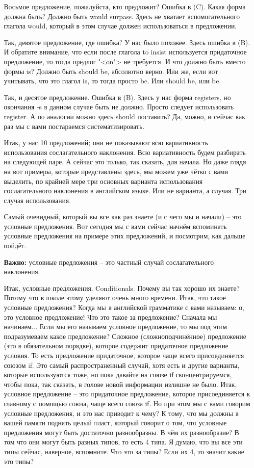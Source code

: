 \documentclass[main.tex]{subfiles}
\begin{document}
Восьмое предложение, пожалуйста, кто предложит?
Ошибка в (C).
Какая форма должна быть?
Должно быть would surpass.
Здесь не хватает вспомогательного глагола would, который в этом случае должен использоваться в предложении.

Так, девятое предложение, где ошибка?
У нас было похожее.
Здесь ошибка в (B).
И обратите внимание, что если после глагола to insist используется придаточное предложение, то тогда предлог "<on"> не требуется.
И что должно быть вместо формы is?
Должно быть should be, абсолютно верно.
Или же, если вот учитывать, что это глагол is, то тогда просто be.
Или should be, или be.

Так, и десятое предложение.
Ошибка в (B).
Здесь у нас форма registers, но окончания -s в данном случае быть не должно.
Просто следует использовать register.
А по аналогии можно здесь should поставить?
Да, можно, и сейчас как раз мы с вами постараемся систематизировать.

Итак, у нас 10 предложений; они не показывают всю вариативность использования сослагательного наклонения.
Всю вариативность будем разбирать на следующей паре.
А сейчас это только, так сказать, для начала.
Но даже глядя на вот примеры, которые представлены здесь, мы можем уже чётко с вами выделить, по крайней мере три основных варианта использования сослагательного наклонения в английском языке.
Или не варианта, а случая.
Три случая использования.

Самый очевидный, который вы все как раз знаете (и с чего мы и начали) -- это условные предложения.
Вот сегодня мы с вами сейчас начнём вспоминать условные предложения на примере этих предложений, и посмотрим, как дальше пойдёт.

\newpage
{}
\label{subsec:conditionals-types}

\textbf{Важно:} условные предложения -- это частный случай сослагательного наклонения.

Итак, условные предложения.
Conditionals.
Почему вы так хорошо их знаете?
Потому что в школе этому уделяют очень много времени.
Итак, что такое условные предложения?
Когда мы в английской грамматике с вами называем: о, это условное предложение!
Что это такое за предложение?
Сначала мы начинаем...
Если мы его называем условное предложение, то мы под этим подразумеваем какое предложение?
Сложное (сложноподчинённое) предложение (это в обязательном порядке), которое содержит придаточное предложение условия.
То есть предложение придаточное, которое чаще всего присоединяется союзом if.
Это самый распространенный случай, хотя есть и другие варианты, которые используются тоже, но пока давайте на союзе if сконцентрируемся, чтобы пока, так сказать, в голове новой информации излишне не было.
Итак, условное предложение -- это придаточное предложение, которое присоединяется к главному с помощью союза, чаще всего союза if.
Но при этом мы с вами говорим условные предложения, и это нас приводит к чему?
К тому, что мы должны в вашей памяти поднять целый пласт, который говорит о том, что условные предложения могут быть достаточно разнообразны.
В чём их разнообразие?
В том что они могут быть разных типов, то есть 4 типа.
Я думаю, что вы все эти типы сейчас, наверное, вспомните.
Что это за типы?
Если их 4, то значит какие это типы?
\end{document}
